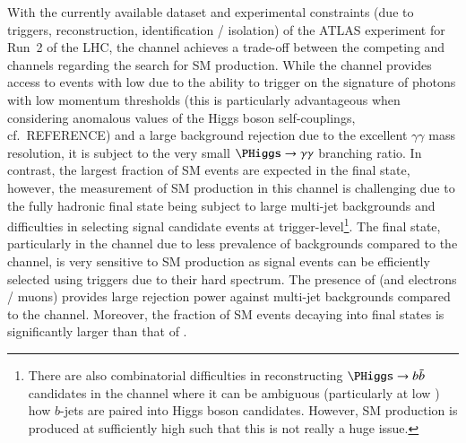 With the currently available dataset and experimental constraints (due
to triggers, reconstruction, identification / isolation) of the ATLAS
experiment for Run~2 of the LHC, the \bbtautau channel achieves a
trade-off between the competing \bbyy and \bbbb channels regarding the
search for SM \HH production. While the \bbyy channel provides access
to events with low \mHH due to the ability to trigger on the signature
of photons with low momentum thresholds (this is particularly
advantageous when considering anomalous values of the Higgs boson
self-couplings, cf.~REFERENCE) and a large background rejection due to
the excellent $\gamma\gamma$ mass resolution, it is subject to the
very small $\PHiggs \to \gamma\gamma$ branching ratio. In contrast,
the largest fraction of SM \HH events are expected in the \bbbb final
state, however, the measurement of SM \HH production in this channel
is challenging due to the fully hadronic final state being subject to
large multi-jet backgrounds and difficulties in selecting signal
candidate events at trigger-level\footnote{There are also
  combinatorial difficulties in reconstructing $\PHiggs \to \bbbar$
  candidates in the \bbbb channel where it can be ambiguous
  (particularly at low \mHH) how $b$-jets are paired into Higgs boson
  candidates. However, SM \HH production is produced at sufficiently
  high \mHH such that this is not really a huge issue.}. The \bbtautau
final state, particularly in the \hadhad channel due to less prevalence
of \ttbar backgrounds compared to the \lephad channel, is very
sensitive to SM \HH production as signal events can be efficiently
selected using \tauhadvis triggers due to their hard \mHH
spectrum. The presence of \tauhadvis (and electrons / muons) provides
large rejection power against multi-jet backgrounds compared to the
\bbbb channel. Moreover, the fraction of SM \HH events decaying into
\bbtautau final states is significantly larger than that of \bbyy.

